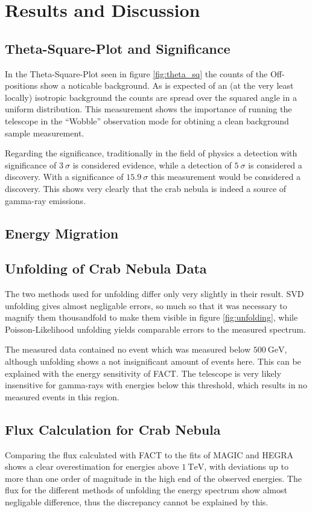 %
%
    \section{Results and Discussion}
        \subsection{Theta-Square-Plot and Significance}
            In the Theta-Square-Plot seen in figure \ref{fig:theta_sq} the counts of the Off-positions show a noticable background.
            As is expected of an (at the very least locally) isotropic background the counts are spread over the squared angle in a uniform distribution.
            This measurement shows the importance of running the telescope in the \enquote{Wobble} observation mode for obtining a clean background sample measurement.

            Regarding the significance, traditionally in the field of physics a detection with significance of $3\:\sigma$ is considered evidence, while a detection of $5\:\sigma$ is considered a discovery.
            With a significance of $\num{15.9}\:\sigma$ this measurement would be considered a discovery.
            This shows very clearly that the crab nebula is indeed a source of gamma-ray emissions.

        \subsection{Energy Migration}
        \subsection{Unfolding of Crab Nebula Data}
            The two methods used for unfolding differ only very slightly in their result.
            SVD unfolding gives almost negligable errors, so much so that it was necessary to magnify them thousandfold to make them visible in figure \ref{fig:unfolding}, while Poisson-Likelihood unfolding yields comparable errors to the measured spectrum.
            
            The measured data contained no event which was measured below $\SI{500}{\giga\electronvolt}$, although unfolding shows a not insignificant amount of events here.
            This can be explained with the energy sensitivity of FACT.
            The telescope is very likely insensitive for gamma-rays with energies below this threshold, which results in no measured events in this region.
        \subsection{Flux Calculation for Crab Nebula}
            Comparing the flux calculated with FACT to the fits of MAGIC and HEGRA shows a clear overestimation for energies above $\SI{1}{\tera\electronvolt}$, with deviations up to more than one order of magnitude in the high end of the observed energies.
            The flux for the different methods of unfolding the energy spectrum show almost negligable difference, thus the discrepancy cannot be explained by this.

